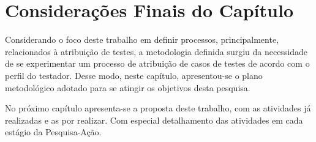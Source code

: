 \section{Considerações Finais do Capítulo}

Considerando o foco deste trabalho em definir processos, principalmente, relacionados à atribuição de testes, a metodologia definida surgiu da necessidade de se experimentar um processo de atribuição de casos de testes de acordo com o perfil do testador. Desse modo, neste capítulo, apresentou-se o plano metodológico adotado para se atingir os objetivos desta pesquisa. 

No próximo capítulo apresenta-se a proposta deste trabalho, com as atividades já realizadas e as por realizar. Com especial detalhamento das atividades em cada estágio da Pesquisa-Ação.

